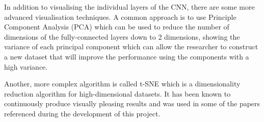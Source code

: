 In addition to visualising the individual layers of the CNN, there are some more advanced visualisation techniques. A common approach is to use Principle Component Analysis (PCA) which can be used to reduce the number of dimensions of the fully-connected layers down to 2 dimensions, showing the variance of each principal component which can allow the researcher to construct a new dataset that will improve the performance using the components with a high variance.

Another, more complex algorithm is called t-SNE  \cite{vanDerMaaten2008} which is a dimensionality reduction algorithm for high-dimensional datasets. It has been known to continuously produce visually pleasing results and was used in some of the papers referenced during the development of this project.
